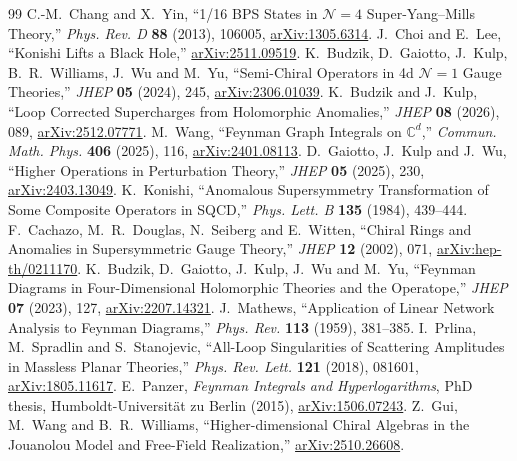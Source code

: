 \documentclass[11pt]{article}
\numberwithin{equation}{section}
\numberwithin{figure}{section}
\numberwithin{table}{section}
\begin{document}
\begin{thebibliography}{99}
\small
{}
C.-M.~Chang and X.~Yin, ``1/16 BPS States in $\mathcal N=4$ Super-Yang--Mills Theory,'' \emph{Phys. Rev. D} \textbf{88} (2013), 106005, \href{https://arxiv.org/abs/1305.6314}{arXiv:1305.6314}.
J.~Choi and E.~Lee, ``Konishi Lifts a Black Hole,'' \href{https://arxiv.org/abs/2511.09519}{arXiv:2511.09519}.
K.~Budzik, D.~Gaiotto, J.~Kulp, B.~R.~Williams, J.~Wu and M.~Yu, ``Semi-Chiral Operators in 4d $\mathcal N=1$ Gauge Theories,'' \emph{JHEP} \textbf{05} (2024), 245, \href{https://arxiv.org/abs/2306.01039}{arXiv:2306.01039}.
K.~Budzik and J.~Kulp, ``Loop Corrected Supercharges from Holomorphic Anomalies,'' \emph{JHEP} \textbf{08} (2026), 089, \href{https://arxiv.org/abs/2512.07771}{arXiv:2512.07771}.
M.~Wang, ``Feynman Graph Integrals on $\mathbb C^d$,'' \emph{Commun. Math. Phys.} \textbf{406} (2025), 116, \href{https://arxiv.org/abs/2401.08113}{arXiv:2401.08113}.
D.~Gaiotto, J.~Kulp and J.~Wu, ``Higher Operations in Perturbation Theory,'' \emph{JHEP} \textbf{05} (2025), 230, \href{https://arxiv.org/abs/2403.13049}{arXiv:2403.13049}.
K.~Konishi, ``Anomalous Supersymmetry Transformation of Some Composite Operators in SQCD,'' \emph{Phys. Lett. B} \textbf{135} (1984), 439--444.
F.~Cachazo, M.~R.~Douglas, N.~Seiberg and E.~Witten, ``Chiral Rings and Anomalies in Supersymmetric Gauge Theory,'' \emph{JHEP} \textbf{12} (2002), 071, \href{https://arxiv.org/abs/hep-th/0211170}{arXiv:hep-th/0211170}.
K.~Budzik, D.~Gaiotto, J.~Kulp, J.~Wu and M.~Yu, ``Feynman Diagrams in Four-Dimensional Holomorphic Theories and the Operatope,'' \emph{JHEP} \textbf{07} (2023), 127, \href{https://arxiv.org/abs/2207.14321}{arXiv:2207.14321}.
J.~Mathews, ``Application of Linear Network Analysis to Feynman Diagrams,'' \emph{Phys. Rev.} \textbf{113} (1959), 381--385.
I.~Prlina, M.~Spradlin and S.~Stanojevic, ``All-Loop Singularities of Scattering Amplitudes in Massless Planar Theories,'' \emph{Phys. Rev. Lett.} \textbf{121} (2018), 081601, \href{https://arxiv.org/abs/1805.11617}{arXiv:1805.11617}.
E.~Panzer, \emph{Feynman Integrals and Hyperlogarithms}, PhD thesis, Humboldt-Universit\"at zu Berlin (2015), \href{https://arxiv.org/abs/1506.07243}{arXiv:1506.07243}.
Z.~Gui, M.~Wang and B.~R.~Williams, ``Higher-dimensional Chiral Algebras in the Jouanolou Model and Free-Field Realization,'' \href{https://arxiv.org/abs/2510.26608}{arXiv:2510.26608}.

\end{thebibliography}
\end{document}
